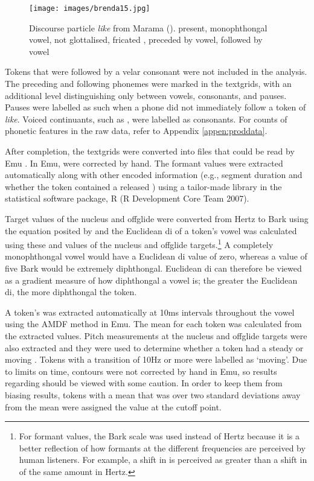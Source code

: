 \begin{figure}[p]
	\centering
		\texttt{[image: images/brenda15.jpg]}
	\caption{Discourse particle \textit{like} from Marama ().  present, monophthongal vowel, not glottalised, fricated , preceded by vowel, followed by vowel}
	\label{fig:brenda15}
\end{figure}





Tokens that were followed by a velar consonant were not included in the analysis. The preceding and following pho\-nemes were marked in the text\-grids, with an additional level distinguishing only between vowels, consonants, and pauses. Pauses were labelled as such when a phone did not immediately follow a token of \textit{like}. Voiced continuants, such as , were labelled as consonants. For counts of phonetic features in the raw data, refer to Appendix \ref{appen:proddata}. 


After completion, the textgrids were converted into files that could be read by Emu \citep{emu}. In Emu,  were corrected by hand. The formant values were extracted automatically along with other encoded information (e.g., segment duration and whether the token contained a released ) using a tailor-made library in the statistical software package, R (R Development Core Team 2007). 

Target values of the nucleus and offglide were converted from Hertz to Bark using the equation posited by \citet{traunmuller1990} and the Euclidean di of a token's vowel was calculated using these  and  values of the nucleus and offglide targets.\footnote{For formant values, the Bark scale was used instead of Hertz because it is a better reflection of how formants at the different frequencies are perceived by human listeners. For example, a shift in  is perceived as greater than a shift in  of the same amount in Hertz.} A completely monophthongal vowel would have a Euclidean di value of zero, whereas a value of five Bark would be extremely diphthongal. Euclidean di can therefore be viewed as a gradient measure of how diphthongal a vowel is; the greater the Euclidean di, the more diphthongal the token. 
\nocite{r}


A token's  was extracted automatically at 10ms intervals throughout the vowel using the AMDF method in Emu. The mean  for each token was calculated from the extracted values. Pitch measurements at the nucleus and offglide targets were also extracted and they were used to determine whether a token had a steady or moving . Tokens with a transition of 10Hz or more were labelled as `moving'. Due to limits on time,  contours were not corrected by hand in Emu, so results regarding  should be viewed with some caution. In order to keep them from biasing results, tokens with a mean  that was over two standard deviations away from the mean were assigned the  value at the cutoff point. 



